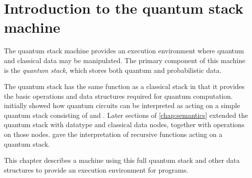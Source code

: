 \section{Introduction to the quantum stack machine}\label{sec:introStackMachine}
The quantum stack machine provides an execution environment where
 quantum and classical data may be manipulated. The primary component
of this machine is the \emph{quantum stack}, which stores both quantum and
probabilistic data.

The quantum stack  has the same function as a  classical stack 
in that it provides the basic
operations and data structures
 required for quantum computation. 
 initially showed how quantum circuits can be
interpreted as acting on  a simple quantum stack consisting
of \bits{} and \qbits. Later sections of \ref{chap:semantics}
extended the quantum stack with datatype and classical data nodes,
together with operations on those nodes. 
gave the interpretation of recursive functions acting on a quantum stack.

This chapter  describes a machine using this full quantum stack and other
data structures to provide an execution environment for \lqpl{} programs.

